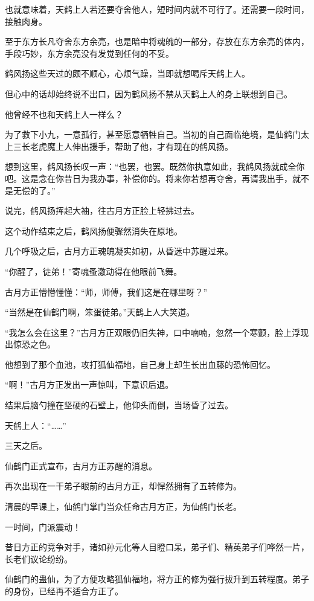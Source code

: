 \begin{this_body}
也就意味着，天鹤上人若还要夺舍他人，短时间内就不可行了。还需要一段时间，接触肉身。

至于东方长凡夺舍东方余亮，也是暗中将魂魄的一部分，存放在东方余亮的体内，手段巧妙，东方余亮没有发觉到任何的不妥。

鹤风扬这些天过的颇不顺心，心烦气躁，当即就想喝斥天鹤上人。

但心中的话却始终说不出口，因为鹤风扬不禁从天鹤上人的身上联想到自己。

他曾经不也和天鹤上人一样么？

为了救下小九，一意孤行，甚至愿意牺牲自己。当初的自己面临绝境，是仙鹤门太上三长老虎魔上人伸出援手，帮助了他，才有现在的鹤风扬。

想到这里，鹤风扬长叹一声：“也罢，也罢。既然你执意如此，我鹤风扬就成全你吧。这是念在你昔日为我办事，补偿你的。将来你若想再夺舍，再请我出手，就不是无偿的了。”

说完，鹤风扬挥起大袖，往古月方正脸上轻拂过去。

这个动作结束之后，鹤风扬便骤然消失在原地。

几个呼吸之后，古月方正魂魄凝实如初，从昏迷中苏醒过来。

“你醒了，徒弟！”寄魂蚤激动得在他眼前飞舞。

古月方正懵懵懂懂：“师，师傅，我们这是在哪里呀？”

“当然是在仙鹤门啊，笨蛋徒弟。”天鹤上人大笑道。

“我怎么会在这里？”古月方正双眼仍旧失神，口中喃喃，忽然一个寒颤，脸上浮现出惊恐之色。

他想到了那个血池，攻打狐仙福地，自己身上却生长出血藤的恐怖回忆。

“啊！”古月方正发出一声惊叫，下意识后退。

结果后脑勺撞在坚硬的石壁上，他仰头而倒，当场昏了过去。

天鹤上人：“……”

三天之后。

仙鹤门正式宣布，古月方正苏醒的消息。

再次出现在一干弟子眼前的古月方正，却悍然拥有了五转修为。

清晨的早课上，仙鹤门掌门当众任命古月方正，为仙鹤门长老。

一时间，门派震动！

昔日方正的竞争对手，诸如孙元化等人目瞪口呆，弟子们、精英弟子们哗然一片，长老们议论纷纷。

仙鹤门的蛊仙，为了方便攻略狐仙福地，将方正的修为强行拔升到五转程度。弟子的身份，已经再不适合方正了。


\end{this_body}
